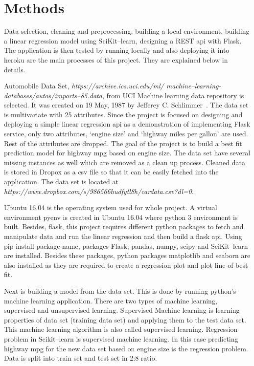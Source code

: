 \section{Methods}

Data selection, cleaning and preprocessing, building a local
environment, building a linear regression model using SciKit--learn,
designing a REST api with Flask. The application is then tested by
running locally and also deploying it into heroku are the main
processes of this project. They are explained below in details.

Automobile Data Set, \textit{https://archive.ics.uci.edu/ml/
  machine--learning-databases/autos/imports--85.data}, from UCI
Machine learning data repository is selected. It was created on 19
May, 1987 by Jefferey C. Schlimmer~\cite{hid-sp18-415-uci-com}. The
data set is multivariate with 25 attributes. Since the project is
focused on designing and deploying a simple linear regression api as a
demonstration of implementing Flask service, only two attributes,
`engine size' and `highway miles per gallon' are used. Rest of the
attributes are dropped. The goal of the project is to build a best fit
prediction model for highway mpg based on engine size. The data set
have several missing instances as well which are removed as a clean up
process. Cleaned data is stored in Dropox as a csv file so that it can
be easily fetched into the application. The data set is located at
\textit{https://www.dropbox.com/s/986566hudfytl8h/cardata.csv?dl=0}.
  
Ubuntu 16.04 is the operating system used for whole project.  A
virtual environment pyenv is created in Ubuntu 16.04 where python 3
environment is built. Besides, flask, this project requires different
python packages to fetch and manipulate data and run the linear
regression and then build a flask api. Using pip install package name,
packages Flask, pandas, numpy, scipy and SciKit--learn are
installed. Besides these packages, python packages matplotlib and
seaborn are also installed as they are required to create a regression
plot and plot line of best fit.
 
Next is building a model from the data set. This is done by running
python's machine learning application. There are two types of machine
learning, supervised and unsupervised learning. Supervised Machine
learning is learning properties of data set (training data set) and
applying them to the test data set. This machine learning algorithm is
also called supervised learning. Regression problem in Scikit--learn
is supervised machine learning. In this case predicting highway mpg
for the new data set based on engine size is the regression
problem. Data is split into train set and test set in 2:8 ratio.
    

